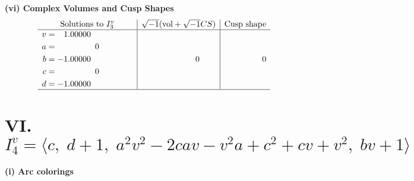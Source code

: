 \documentclass[1p]{elsarticle_modified}
\theoremstyle{definition}
\newcommand{\I}{\sqrt{-1}}
\begin{document}
\newpage\flushleft \textbf{(vi) Complex Volumes and Cusp Shapes}
$$\begin{array}{c|c|c}  
\text{Solutions to }I^v_{3}& \I (\text{vol} + \sqrt{-1}CS) & \text{Cusp shape}\\
 \hline 
\begin{aligned}
v &= \phantom{-}1.00000\phantom{ +0.000000I} \\
a &= \phantom{-0.000000 } 0 \\
b &= -1.00000\phantom{ +0.000000I} \\
c &= \phantom{-0.000000 } 0 \\
d &= -1.00000\phantom{ +0.000000I}\end{aligned}
 & \phantom{-0.000000 } 0 & \phantom{-0.000000 } 0\\
 \hline 
 \end{array}$$\newpage\newpage\renewcommand{\arraystretch}{1}
\centering \section*{VI. $I^v_{4}= \langle c,\;d+1,\;a^2 v^2-2 c a v- v^2 a+c^2+c v+v^2,\;b v+1 \rangle$}
\flushleft \textbf{(i) Arc colorings}\\
\end{document}
